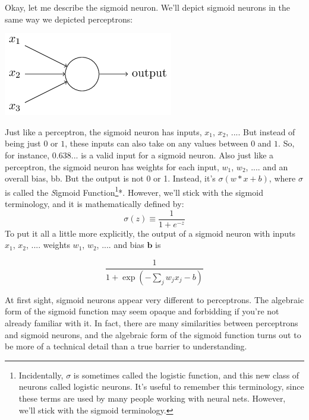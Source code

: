 \documentclass[a4paper,12pt]{report}%
\begin{document}
Okay, let me describe the sigmoid neuron. We'll depict sigmoid neurons in the same way we depicted perceptrons:

\begin{center}
 \includegraphics[width=0.6\linewidth]{images/tikz9.png}
\end{center}


Just like a perceptron, the sigmoid neuron has inputs, $x_{1}$, $x_{2}$, .... But instead of being just $0$ or $1$, these inputs can also take on any values between $0$ and $1$. So, for instance, $0.638...$ is a valid input for a sigmoid neuron. Also just like a perceptron, the sigmoid neuron has weights for each input, $w_{1}$, $w_{2}$, .... and an overall bias, bb. But the output is not 0 or 1. Instead, it's $\sigma(w*x+b)$, where $\sigma$ is called the {\emph Sigmoid Function}\footnote{\color{blue}Incidentally, $\sigma$ is sometimes called the logistic function, and this new class of neurons called logistic neurons. It's useful to remember this terminology, since these terms are used by many people working with neural nets. However, we'll stick with the sigmoid terminology.}{\color{blue}*}. %
However, we'll stick with the sigmoid terminology, and it is mathematically defined by:
\begin{equation}
\sigma(z) \equiv \frac{1}{1+e^{-z}}
\end{equation}
To put it all a little more explicitly, the output of a sigmoid neuron with inputs $x_{1}$, $x_{2}$, .... weights $w_{1}$, $w_{2}$, .... and bias $\mathbf{b}$ is

\begin{equation}
\frac{1} {1+ \exp(−\sum_{j} w_{j} x_{j} − b )}
\end{equation}

At first sight, sigmoid neurons appear very different to perceptrons. The algebraic form of the sigmoid function may seem opaque and forbidding if you're not already familiar with it. In fact, there are many similarities between perceptrons and sigmoid neurons, and the algebraic form of the sigmoid function turns out to be more of a technical detail than a true barrier to understanding.
\end{document}
